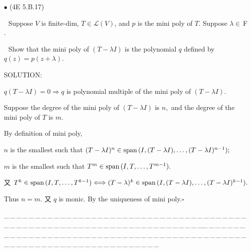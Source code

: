 \documentclass[a4paper, 11pt, UTF8]{article}
\def\Spn{\textup{span}\,}
\def\Lm{\mathcal{L}}
\def\Fbfc{$\,{\timesbf F}$}
\begin{document}
\begin{large}
{\small $\bullet$} ({\normalsize4E 5.B.17})\par\,\, {\timessl\Large 
Suppose $V$ is finite-dim, $T\in \Lm(V)$, and $p$ is the mini poly of $T$. Suppose $\lambda \in\Fbfc.$}\par\,\,
{\timessl\Large Show that the mini poly of $(T - \lambda I)$ is the polynomial $q$ defined by $q(z) = p(z + \lambda).$
}\par
{\timesbf S\footnotesize{OLUTION:}}\par\quad
$q(T-\lambda I)=0\Rightarrow q$ is polynomial multiple of the mini poly of $(T-\lambda I).$\par\quad
Suppose the degree of the mini poly of $(T-\lambda I)$ is $n,$ and the degree of the mini poly of $T$ is $m.$\par\quad
By definition of mini poly,\par\quad
$n$ is the smallest such that $(T-\lambda I)^n\in\Spn(I,(T-\lambda I),\dots,(T-\lambda I)^{n-1});$\par\quad
$m$ is the smallest such that $T^m\in\Spn(I,T,\dots,T^{m-1}).$\par\quad
又 $T^k\in\Spn(I,T,\dots,T^{k-1})\Longleftrightarrow (T-\lambda)^k\in\Spn(I,(T-\lambda I),\dots,(T-\lambda I)^{k-1}).$\par\quad
Thus $n=m.$ 又 $q$ is monic. By the uniqueness of mini poly.\quad$\square$\par
{\tiny \_\,\_\,\_\,\_\,\_\,\_\,\_\,\_\,\_\,\_\,\_\,\_\,\_\,\_\,\_\,\_\,\_\,\_\,\_\,\_\,\_\,\_\,\_\,\_\,\_\,\_\,\_\,\_\,\_\,\_\,\_\,\_\,\_\,\_\,\_\,\_\,\_\,\_\,\_\,\_\,\_\,\_\,\_\,\_\,\_\,\_\,\_\,\_\,\_\,\_\,\_\,\_\,\_\,\_\,\_\,\_\,\_\,\_\,\_\,\_\,\_\,\_\,\_\,\_\,\_\,\_\,\_\,\_\,\_\,\_\,\_\_\,\_\,\_\,\_\,\_\,\_\,\_\,\_\,\_\,\_\,\_\,\_\,\_\,\_\,\_\,\_\,\_\,\_\,\_\,\_\,\_\,\_\,\_\,\_\,\_\,\_\,\_\,\_\,\_\,\_\,\_\,\_\,\_\,\_\,\_\,\_\,\_\,\_\,\_\,\_\,\_\,\_\,\_\,\_\,\_\,\_\,\_\,\_\,\_\,\_\,\_\,\_\,\_\,\_\,\_\,\_\,\_\,\_\,\_\,\_\,\_\,\_\,\_\,\_\,\_\,\_\,\_\,\_\,\_\,\_\,\_}\par


\end{large}
\end{document}
